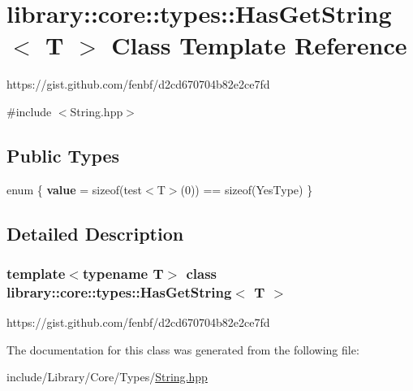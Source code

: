 \hypertarget{classlibrary_1_1core_1_1types_1_1_has_get_string}{}\section{library\+:\+:core\+:\+:types\+:\+:Has\+Get\+String$<$ T $>$ Class Template Reference}
\label{classlibrary_1_1core_1_1types_1_1_has_get_string}


https\+://gist.github.\+com/fenbf/d2cd670704b82e2ce7fd  




{\ttfamily \#include $<$String.\+hpp$>$}

\subsection*{Public Types}
\begin{DoxyCompactItemize}
\item 
\mbox{\label{classlibrary_1_1core_1_1types_1_1_has_get_string_a081f4360067f3eb25ebdafd63aac3afb}} 
enum \{ {\bfseries value} = sizeof(test$<$T$>$(0)) == sizeof(Yes\+Type)
 \}
\end{DoxyCompactItemize}


\subsection{Detailed Description}
\subsubsection*{template$<$typename T$>$\newline
class library\+::core\+::types\+::\+Has\+Get\+String$<$ T $>$}

https\+://gist.github.\+com/fenbf/d2cd670704b82e2ce7fd 

The documentation for this class was generated from the following file\+:\begin{DoxyCompactItemize}
\item 
include/\+Library/\+Core/\+Types/\hyperlink{_string_8hpp}{String.\+hpp}\end{DoxyCompactItemize}
